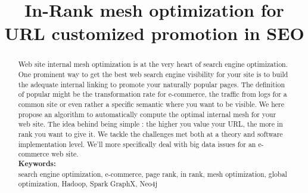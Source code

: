 \documentclass{iSWAGArticle}
\title{In-Rank mesh optimization for URL customized promotion in SEO}
\author{\iSWAGAuthor{Stefan Duprey\\
  Cdiscount\\
  stefan.duprey@cdiscount.com} \and \iSWAGAuthor{Fabien Jaunas\\
  Cdiscount\\
  fabien.jaunas@cdiscount.com}}
\begin{document}
  \maketitle
  \begin{abstract}
  Web site internal mesh optimization is at the very heart of search engine optimization. 
  One prominent way to get the best web search engine visibility for your site 
  is to build the adequate internal linking to promote your naturally popular pages. 
  The definition of popular might be the transformation rate for e-commerce, 
  the traffic from logs for a common site or even rather a specific semantic where you want to be visible. 
  We here propose an algorithm to automatically compute the optimal internal mesh for your web site. The idea
  behind being simple : the higher you value your URL, the more in rank you want to give it.
  We tackle the challenges met both at a theory and software implementation level. 
  We'll more specifically deal with big data issues for an e-commerce web site.
  \\\newline
  \indent \textbf{Keywords: }
  \\\newline
  search engine optimization, e-commerce, page rank, in rank, mesh optimization, global optimization, Hadoop, Spark GraphX, Neo4j
  \end{abstract}
\end{document}
